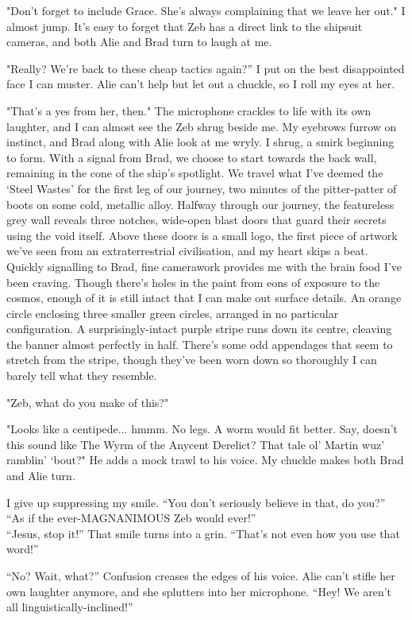 "Don't forget to include Grace. She's always complaining that we leave her out." I almost jump. It’s easy to forget that Zeb has a direct link to the shipsuit cameras, and both Alie and Brad turn to laugh at me.  

"Really? We’re back to these cheap tactics again?” I put on the best disappointed face I can muster. Alie can’t help but let out a chuckle, so I roll my eyes at her.  

"That's a yes from her, then." The microphone crackles to life with its own laughter, and I can almost see the Zeb shrug beside me. My eyebrows furrow on instinct, and Brad along with Alie look at me wryly. I shrug, a smirk beginning to form. With a signal from Brad, we choose to start towards the back wall, remaining in the cone of the ship’s spotlight. We travel what I’ve deemed the ‘Steel Wastes’ for the first leg of our journey, two minutes of the pitter-patter of boots on some cold, metallic alloy. Halfway through our journey, the featureless grey wall reveals three notches, wide-open blast doors that guard their secrets using the void itself. Above these doors is a small logo, the first piece of artwork we’ve seen from an extraterrestrial civilisation, and my heart skips a beat. Quickly signalling to Brad, fine camerawork provides me with the brain food I’ve been craving. Though there’s holes in the paint from eons of exposure to the cosmos, enough of it is still intact that I can make out surface details. An orange circle enclosing three smaller green circles, arranged in no particular configuration. A surprisingly-intact purple stripe runs down its centre, cleaving the banner almost perfectly in half. There’s some odd appendages that seem to stretch from the stripe, though they’ve been worn down so thoroughly I can barely tell what they resemble.  

"Zeb, what do you make of this?"  

"Looks like a centipede... hmmm. No legs. A worm would fit better. Say, doesn’t this sound like The Wyrm of the Anycent Derelict? That tale ol’ Martin wuz’ ramblin’ ‘bout?"  He adds a mock trawl to his voice. My chuckle makes both Brad and Alie turn.  

I give up suppressing my smile. “You don’t seriously believe in that, do you?”\\
“As if the ever-MAGNANIMOUS Zeb would ever!”  \\
“Jesus, stop it!” That smile turns into a grin. “That’s not even how you use that word!” 

“No? Wait, what?” Confusion creases the edges of his voice. Alie can’t stifle her own laughter anymore, and she splutters into her microphone. “Hey! We aren’t all linguistically-inclined!”  

